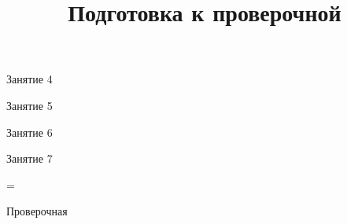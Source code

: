 \begin{class}[number=4]
	\begin{listofex}
		\item Занятие 4
	\end{listofex}
\end{class}

\begin{class}[number=5]
	\begin{listofex}
		\item Занятие 5
	\end{listofex}
\end{class}

\begin{class}[number=6]
	\begin{listofex}
		\item Занятие 6
	\end{listofex}
\end{class}

\begin{class}[number=7]
	\title{Подготовка к проверочной}
	\begin{listofex}
		\item Занятие 7
	\end{listofex}
\end{class}

=%
\begin{exam}
	\begin{listofex}
		\item Проверочная
	\end{listofex}
\end{exam}
